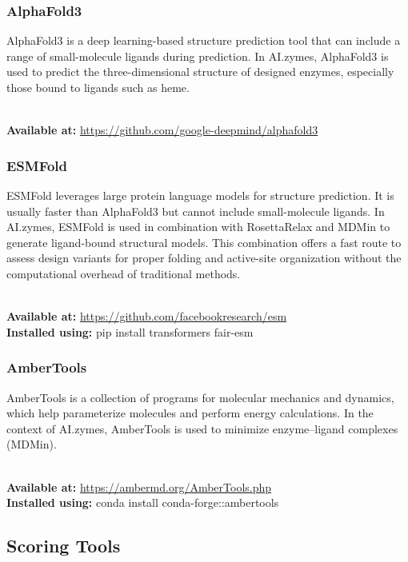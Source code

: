 \documentclass[10pt]{extarticle}
\begin{document}
\subsubsection{AlphaFold3}

AlphaFold3 is a deep learning-based structure prediction tool that can include a range of small-molecule ligands during prediction. In AI.zymes, AlphaFold3 is used to predict the three-dimensional structure of designed enzymes, especially those bound to ligands such as heme.

\\ \textbf{Available at:} \href{https://github.com/google-deepmind/alphafold3}{https://github.com/google-deepmind/alphafold3}

\subsubsection{ESMFold}

ESMFold leverages large protein language models for structure prediction. It is usually faster than AlphaFold3 but cannot include small-molecule ligands. In AI.zymes, ESMFold is used in combination with RosettaRelax and MDMin to generate ligand-bound structural models. This combination offers a fast route to assess design variants for proper folding and active-site organization without the computational overhead of traditional methods.

\\ \textbf{Available at:} \href{https://github.com/facebookresearch/esm}{https://github.com/facebookresearch/esm}
\\ \textbf{Installed using:} pip install transformers fair-esm

\subsubsection{AmberTools}

AmberTools is a collection of programs for molecular mechanics and dynamics, which help parameterize molecules and perform energy calculations. In the context of AI.zymes, AmberTools is used to minimize enzyme–ligand complexes (MDMin).

\\ \textbf{Available at:} \href{https://ambermd.org/AmberTools.php}{https://ambermd.org/AmberTools.php}
\\ \textbf{Installed using:} conda install conda-forge::ambertools


\subsection{Scoring Tools}
\end{document}
